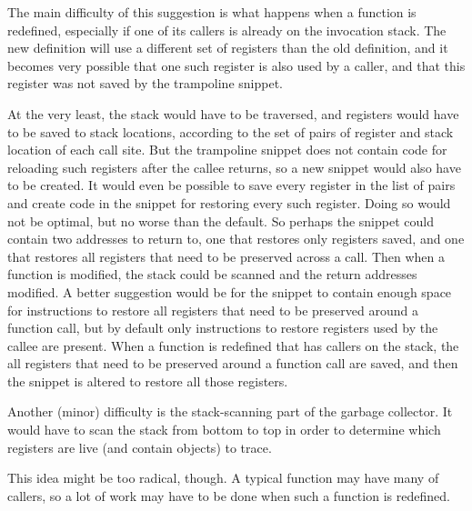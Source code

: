 The main difficulty of this suggestion is what happens when a function
is redefined, especially if one of its callers is already on the
invocation stack.  The new definition will use a different set of
registers than the old definition, and it becomes very possible that
one such register is also used by a caller, and that this register was
not saved by the trampoline snippet.

At the very least, the stack would have to be traversed, and registers
would have to be saved to stack locations, according to the set of
pairs of register and stack location of each call site.  But the
trampoline snippet does not contain code for reloading such registers
after the callee returns, so a new snippet would also have to be
created.  It would even be possible to save every register in the list
of pairs and create code in the snippet for restoring every such
register.  Doing so would not be optimal, but no worse than the
default.  So perhaps the snippet could contain two addresses to return
to, one that restores only registers saved, and one that restores all
registers that need to be preserved across a call.  Then when a
function is modified, the stack could be scanned and the return
addresses modified.  A better suggestion would be for the snippet to
contain enough space for instructions to restore all registers that
need to be preserved around a function call, but by default only
instructions to restore registers used by the callee are present.
When a function is redefined that has callers on the stack, the all
registers that need to be preserved around a function call are saved,
and then the snippet is altered to restore all those registers.

Another (minor) difficulty is the stack-scanning part of the garbage
collector.  It would have to scan the stack from bottom to top in
order to determine which registers are live (and contain \commonlisp{}
objects) to trace.

This idea might be too radical, though.  A typical function may have
many of callers, so a lot of work may have to be done when such a
function is redefined.

